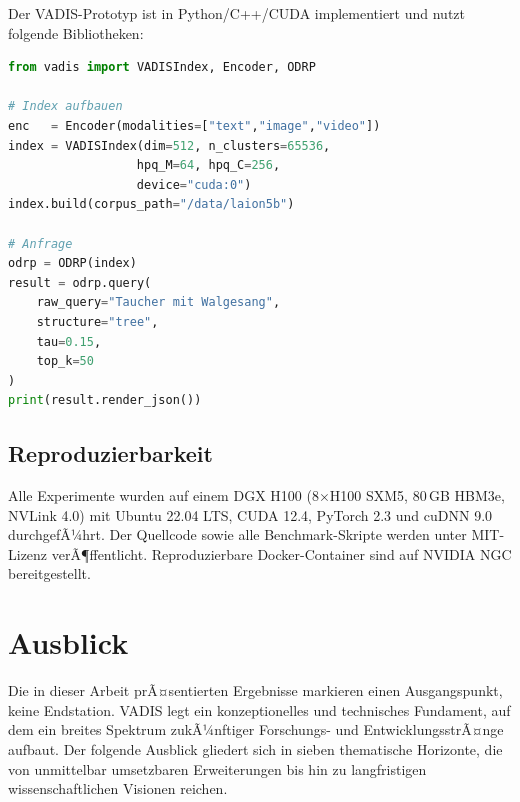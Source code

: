 ﻿\documentclass[12pt,a4paper]{article}
\begin{document}
Der VADIS-Prototyp ist in Python/C++/CUDA implementiert
und nutzt folgende Bibliotheken:

\begin{lstlisting}[language=Python, caption={VADIS Python API (Auszug)}]
from vadis import VADISIndex, Encoder, ODRP

# Index aufbauen
enc   = Encoder(modalities=["text","image","video"])
index = VADISIndex(dim=512, n_clusters=65536,
                  hpq_M=64, hpq_C=256,
                  device="cuda:0")
index.build(corpus_path="/data/laion5b")

# Anfrage
odrp = ODRP(index)
result = odrp.query(
    raw_query="Taucher mit Walgesang",
    structure="tree",
    tau=0.15,
    top_k=50
)
print(result.render_json())
\end{lstlisting}

\subsection{Reproduzierbarkeit}

Alle Experimente wurden auf einem DGX H100 (8$\times$H100 SXM5,
80\,GB HBM3e, NVLink 4.0) mit Ubuntu 22.04 LTS, CUDA 12.4,
PyTorch 2.3 und cuDNN 9.0 durchgefÃ¼hrt. Der Quellcode sowie
alle Benchmark-Skripte werden unter MIT-Lizenz verÃ¶ffentlicht.
Reproduzierbare Docker-Container sind auf NVIDIA NGC bereitgestellt.


\section{Ausblick}
\label{sec:ausblick_gross}

Die in dieser Arbeit prÃ¤sentierten Ergebnisse markieren einen
Ausgangspunkt, keine Endstation. VADIS legt ein konzeptionelles
und technisches Fundament, auf dem ein breites Spektrum zukÃ¼nftiger
Forschungs- und EntwicklungsstrÃ¤nge aufbaut. Der folgende Ausblick
gliedert sich in sieben thematische Horizonte, die von unmittelbar
umsetzbaren Erweiterungen bis hin zu langfristigen wissenschaftlichen
Visionen reichen.
\end{document}
